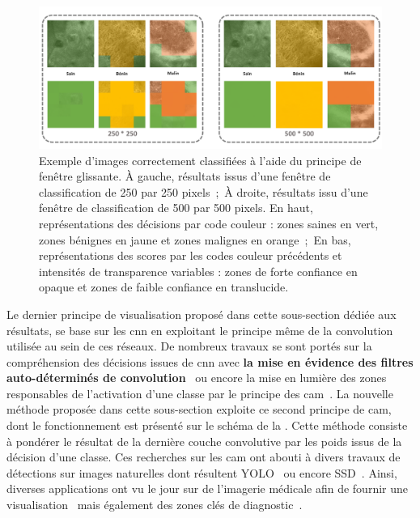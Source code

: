 \begin{figure}[H]
    \centering
    \includegraphics[width=\linewidth]{contents/chapter_6/resources/exemple_image_improvement_well.pdf}
    \caption{Exemple d'images correctement classifiées à l'aide du principe de fenêtre glissante. À gauche, résultats issus d'une fenêtre de classification de 250 par 250 pixels~;~À droite, résultats issu d'une fenêtre de classification de 500 par 500 pixels. En haut, représentations des décisions par code couleur : zones saines en vert, zones bénignes en jaune et zones malignes en orange~;~En bas, représentations des scores par les codes couleur précédents et intensités de transparence variables : zones de forte confiance en opaque et zones de faible confiance en translucide.}
    \label{fig:exemple_image_improvement_well}
\end{figure}\par

Le dernier principe de visualisation proposé dans cette sous-section dédiée aux résultats, se base sur les \gls{cnn} en exploitant le principe même de la convolution utilisée au sein de ces réseaux. De nombreux travaux se sont portés sur la compréhension des décisions issues de \gls{cnn} avec \textbf{la mise en évidence des filtres auto-déterminés de convolution}~\cite{Zeiler2014} ou encore la mise en lumière des zones responsables de l'activation d'une classe par le principe des \acrlong{cam}~\cite{Zhou2015}. La nouvelle méthode proposée dans cette sous-section exploite ce second principe de \gls{cam}, dont le fonctionnement est présenté sur le schéma de la . Cette méthode consiste à pondérer le résultat de la dernière couche convolutive par les poids issus de la décision d'une classe. Ces recherches sur les \gls{cam} ont abouti à divers travaux de détections sur images naturelles dont résultent YOLO~\cite{Redmon2016} ou encore SSD~\cite{Liu2016}. Ainsi, diverses applications ont vu le jour sur de l'imagerie médicale afin de fournir une visualisation~\cite{jia2017} mais également des zones clés de diagnostic~\cite{Park2019}.\par 
\clearpage

